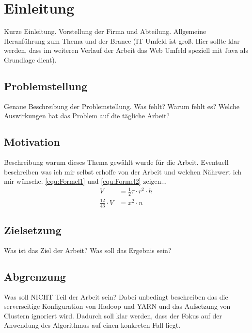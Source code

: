 
\chapter{Einleitung}\label{cha:Einleitung}
Kurze Einleitung. Vorstellung der Firma und Abteilung. Allgemeine Heranführung zum Thema und der Brance (IT Umfeld ist groß. Hier sollte klar werden, dass im weiteren Verlauf der Arbeit das Web Umfeld speziell mit Java als Grundlage dient).

\section{Problemstellung}\label{sec:Problemstellung}
Genaue Beschreibung der Problemstellung. Was fehlt? Warum fehlt es? Welche Auswirkungen hat das Problem auf die tägliche Arbeit?

\section{Motivation}\label{sec:Motivation}
Beschreibung warum dieses Thema gewählt wurde für die Arbeit. Eventuell beschreiben was ich mir selbst erhoffe von der Arbeit und welchen Nährwert ich mir wünsche. \autoref{equ:Formel1} und \ref{equ:Formel2} zeigen...
\begin{align}
	V & = \frac{1}{2} \tau \cdot r^{2} \cdot h
	\label{equ:Formel1} \\
	\frac{12}{43} \cdot V & = x^2 \cdot n
	\label{equ:Formel2}
\end{align}

\section{Zielsetzung}\label{sec:Zielsetzung}
Was ist das Ziel der Arbeit? Was soll das Ergebnis sein?

\section{Abgrenzung}\label{sec:Abgrenzung}
Was soll NICHT Teil der Arbeit sein? Dabei unbedingt beschreiben das die serverseitige Konfiguration von Hadoop und YARN und das Aufsetzung von Clustern ignoriert wird. Dadurch soll klar werden, dass der Fokus auf der Anwendung des Algorithmus auf einen konkreten Fall liegt.